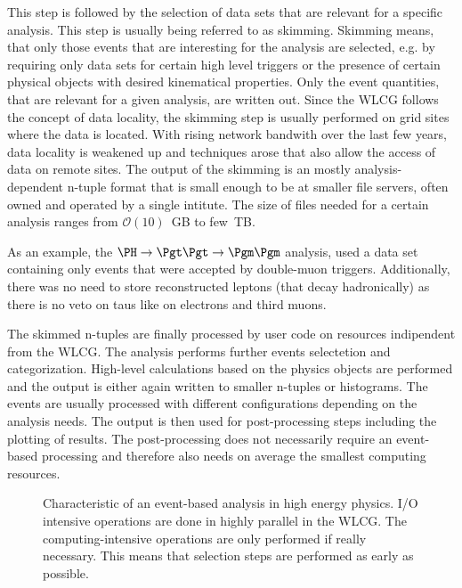 \documentclass[3p]{elsarticle}
\begin{document}
This step is followed by the selection of data sets that are relevant for a specific analysis.
This step is usually being referred to as skimming.
Skimming means, that only those events that are interesting for the analysis are selected, e.g.
by requiring only data sets for certain high level triggers or the presence of certain physical objects with desired kinematical properties.
Only the event quantities, that are relevant for a given analysis, are written out.
Since the WLCG follows the concept of data locality, the skimming step is usually performed on grid sites where the data is located.
With rising network bandwith over the last few years, data locality is weakened up and techniques arose that also allow the access of data on remote sites.
The output of the skimming is an mostly analysis-dependent n-tuple format that is small enough to be at smaller file servers, often owned and operated by a single intitute.
The size of files needed for a certain analysis ranges from $\mathcal O(10)$~GB to few~TB.

As an example, the $\PH\to\Pgt\Pgt\to\Pgm\Pgm$ analysis, used a data set containing only events that were accepted by double-muon triggers.
Additionally, there was no need to store reconstructed \Pgt leptons (that decay hadronically) as there is no veto on taus like on electrons and third muons.

The skimmed n-tuples are finally processed by user code on resources indipendent from the WLCG.
The analysis performs further events selectetion and categorization.
High-level calculations based on the physics objects are performed and the output is either again written to smaller n-tuples or histograms.
The events are usually processed with different configurations depending on the analysis needs.
The output is then used for post-processing steps including the plotting of results.
The post-processing does not necessarily require an event-based processing and therefore also needs on average the smallest computing resources.


\begin{figure}[p]
\centering 
\caption[Characteristics of an event-based analysis in high energy physics]{Characteristic of an event-based analysis in high energy physics.
I/O intensive operations are done in highly parallel in the WLCG.
The computing-intensive operations are only performed if really necessary.
This means that selection steps are performed as early as possible.}
\label{figure_analysis_steps}
\end{figure}
\clearpage
\end{document}
